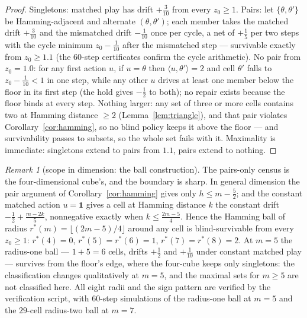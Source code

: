 \documentclass[10pt,twocolumn]{article}
\theoremstyle{plain}
\theoremstyle{definition}
\theoremstyle{remark}
\newtheorem{remark}[theorem]{Remark}
\begin{document}
\begin{proof}
Singletons: matched play has drift \(+\tfrac3{10}\) from every
\(z_{0} \ge 1\). Pairs: let \(\{\theta, \theta'\}\) be
Hamming-adjacent and alternate \((\theta, \theta')\); each member
takes the matched drift \(+\tfrac3{10}\) and the mismatched drift
\(-\tfrac1{10}\) once per cycle, a net of \(+\tfrac15\) per two
steps with the cycle minimum \(z_{0} - \tfrac1{10}\) after the
mismatched step --- survivable exactly from \(z_{0} \ge 1.1\)
(the \(60\)-step certificates confirm the cycle arithmetic).
No pair from \(z_{0} = 1.0\): for any first action \(u\), if
\(u = \theta\) then \(\langle u, \theta'\rangle = 2\) and cell
\(\theta'\) falls to \(z_{0} - \tfrac1{10} < 1\) in one step, while
any other \(u\) drives at least one member below the floor in its
first step (the hold gives \(-\tfrac12\) to both); no repair exists
because the floor binds at every step. Nothing larger: any set of
three or more cells contains two at Hamming distance \(\ge 2\)
(Lemma~\ref{lem:triangle}), and that pair violates
Corollary~\ref{cor:hamming}, so no blind policy keeps it above the
floor --- and survivability passes to subsets, so the whole set fails
with it. Maximality is immediate: singletons extend to pairs from
\(1.1\), pairs extend to nothing.
\end{proof}

\begin{remark}[scope in dimension: the ball construction]
\label{rem:scope}
The pairs-only census is the four-dimensional cube's, and the boundary
is sharp. In general dimension the pair argument of
Corollary~\ref{cor:hamming} gives only \(h \le m - \tfrac52\); and
the constant matched action \(u = \mathbf{1}\) gives a cell at
Hamming distance \(k\) the constant drift
\(-\tfrac12 + \tfrac{m - 2k}{5}\), nonnegative exactly when
\(k \le \tfrac{2m-5}{4}\). Hence the Hamming ball of radius
\(r^{*}(m) = \lfloor (2m - 5)/4 \rfloor\) around any cell is
blind-survivable from every \(z_{0} \ge 1\):
\(r^{*}(4) = 0\), \(r^{*}(5) = r^{*}(6) = 1\),
\(r^{*}(7) = r^{*}(8) = 2\). At \(m = 5\) the radius-one ball ---
\(1 + 5 = 6\) cells, drifts \(+\tfrac12\) and \(+\tfrac1{10}\)
under constant matched play --- survives from the floor's edge, where
the four-cube keeps only singletons: the classification changes
qualitatively at \(m = 5\), and the maximal sets for \(m \ge 5\)
are not classified here. All eight radii and the sign pattern are
verified by the verification script, with \(60\)-step simulations of the
radius-one ball at \(m = 5\) and the \(29\)-cell radius-two ball at
\(m = 7\).
\end{remark}
\end{document}
